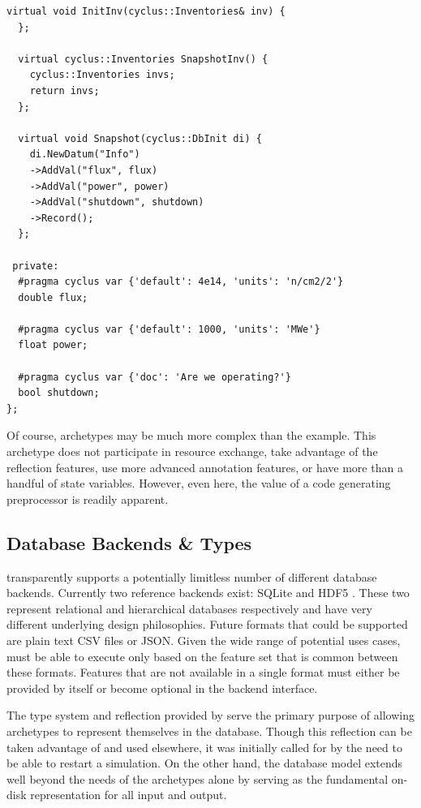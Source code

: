 \begin{lstlisting}[caption={Simple Reactor Archetype After Preprocessing with \cycpp, 
                            line marker directives have been removed for space}, 
                   label=rx-eg-cycpp]
  virtual void InitInv(cyclus::Inventories& inv) {
  };

  virtual cyclus::Inventories SnapshotInv() {
    cyclus::Inventories invs;
    return invs;
  };

  virtual void Snapshot(cyclus::DbInit di) {
    di.NewDatum("Info")
    ->AddVal("flux", flux)
    ->AddVal("power", power)
    ->AddVal("shutdown", shutdown)
    ->Record();
  };

 private:
  #pragma cyclus var {'default': 4e14, 'units': 'n/cm2/2'}
  double flux;

  #pragma cyclus var {'default': 1000, 'units': 'MWe'}
  float power;

  #pragma cyclus var {'doc': 'Are we operating?'}
  bool shutdown;
};
\end{lstlisting}

Of course, archetypes may be much more complex than the  example.
This archetype does not participate in resource exchange, take advantage of 
the reflection features, use more advanced annotation features, or have more than 
a handful of state variables.  However, even here, the value of a code generating
preprocessor is readily apparent.

\subsection{Database Backends \& Types}

\Cyclus transparently supports a potentially limitless number of different database 
backends. Currently two reference backends exist: \gls{SQLite} \cite{owens2006definitive} 
and \gls{HDF5} \cite{folk2011overview}. These two represent relational and hierarchical 
databases respectively and have very different underlying design philosophies.
Future formats that could be supported are plain text 
\gls{CSV} files or \gls{JSON}.  Given the wide range of potential uses cases, \cyclus must be able 
to execute only based on the feature set that is common between these formats.
Features that are not available in a single format must either be provided by \cyclus 
itself or become optional in the backend interface.

The type system and reflection provided by \cycpp serve the primary purpose of 
allowing archetypes to represent themselves in the database. Though this 
reflection can be taken advantage of and used elsewhere, it was initially called for 
by the need to be able to restart a simulation. On the other hand, 
the database model extends well beyond the needs of the archetypes alone by 
serving as the fundamental on-disk representation for all \cyclus input and output.

